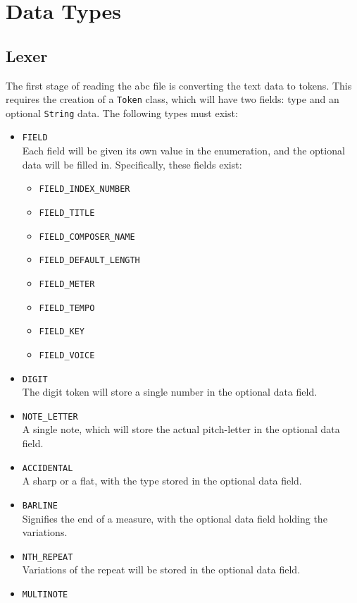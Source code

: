 \documentclass[12pt]{article}
\begin{document}
\section{Data Types}
\subsection{Lexer}
The first stage of reading the abc file is converting the text data to
tokens.  This requires the creation of a \texttt{Token} class, which
will have two fields: type and an optional \texttt{String} data.  The
following types must exist:

\begin{itemize}
\item \texttt{FIELD}\\
  Each field will be given its own value in the enumeration, and the
  optional data will be filled in. Specifically, these fields exist:
  \begin{itemize}
  \item \texttt{FIELD\_INDEX\_NUMBER}
  \item \texttt{FIELD\_TITLE}
  \item \texttt{FIELD\_COMPOSER\_NAME}
  \item \texttt{FIELD\_DEFAULT\_LENGTH}
  \item \texttt{FIELD\_METER}
  \item \texttt{FIELD\_TEMPO}
  \item \texttt{FIELD\_KEY}
  \item \texttt{FIELD\_VOICE}
  \end{itemize}
\item \texttt{DIGIT}\\
  The digit token will store a single number in the optional data
  field.
\item \texttt{NOTE\_LETTER}\\
  A single note, which will store the actual pitch-letter in the
  optional data field.
\item \texttt{ACCIDENTAL}\\
  A sharp or a flat, with the type stored in the optional data field.
\item \texttt{BARLINE}\\
  Signifies the end of a measure, with the optional data field holding
  the variations.
\item \texttt{NTH\_REPEAT}\\
  Variations of the repeat will be stored in the optional data field.
\item \texttt{MULTINOTE}\\

\end{itemize}
\end{document}
